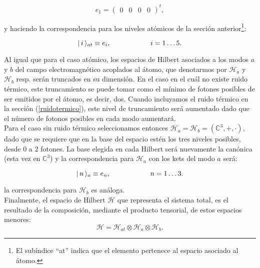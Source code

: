 $$
e_1=\left(
\begin{array}{cccc}
0&0&0&0
\end{array}
\right)^t,
$$

y haciendo la correspondencia para los niveles at\'omicos de la secci\'on anterior\footnote{El sub\'indice ``at'' indica que el elemento pertenece al espacio asociado al \'atomo.}:

$$\vert\, i \,\rangle_{at}\equiv e_i,\hspace{2cm}i=1\ldots 5.$$

\quad Al igual que para el caso at\'omico, los espacios de Hilbert asociados a los modos $a$ y $b$ del campo electromagn\'etico acoplados al \'atomo, que denotarmos por $\mathcal{H}_a$ y $\mathcal{H}_b$ resp. ser\'an truncados en su dimensi\'on. En el caso en el cu\'al no existe ruido t\'ermico, este truncamiento se puede tomar como el m\'inimo de fotones posibles de ser emitidos por el \'atomo, es decir, dos. Cuando incluyamos el ruido t\'ermico en la secci\'on (\ref{ruidotermico}), este nivel de truncamiento ser\'a aumentado dado que el n\'umero de fotonos posibles en cada modo aumentar\'a.\\

\quad Para el caso sin ruido t\'ermico seleccionamos entonces $\mathcal{H}_a=\mathcal{H}_b=\left(\mathbb{C}^3,+,\cdot\right)$, dado que se requiere que en la base del espacio est\'en los tres niveles posibles, desde $0$ a $2$ fotones. La base elegida en cada Hilbert ser\'a nuevamente la can\'onica (esta vez en $\mathbb{C}^3$) y la correspondencia para $\mathcal{H}_a$ con los kets del modo $a$ ser\'a:

$$\vert\, n \,\rangle_a\equiv e_n,\hspace{2cm} n=1\ldots 3.$$

la correspondencia para $\mathcal{H}_b$ es an\'aloga.\\

\quad Finalmente, el espacio de Hilbert $\mathcal{H}$ que representa el sistema total, es el resultado de la composici\'on, mediante el producto tensorial, de estos espacios menores: $$\mathcal{H}=\mathcal{H}_{at}\otimes \mathcal{H}_{a} \otimes \mathcal{H}_{b}.$$

